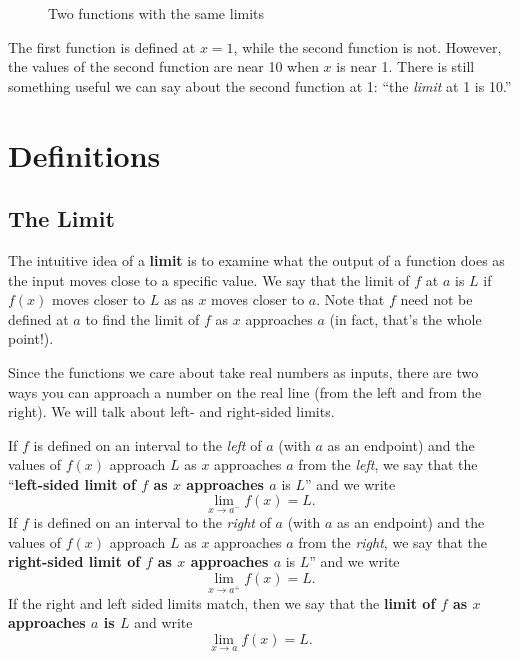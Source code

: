 \begin{exampleblock}
\begin{figure}[H]
{

    }
    \caption{Two functions with the same limits}
\end{figure}

The first function is defined at $x=1$, while the second function is not. However, the values of the second function are near 10 when $x$ is near 1. There is still something useful we can say about the second function at 1: ``the \textit{limit} at 1 is 10.''
\end{exampleblock}



\clearpage
\section{Definitions}

\subsection{The Limit}

The intuitive idea of a \textbf{limit} is to examine what the output of a function does as the input moves close to a specific value. We say that the limit of $f$ at $a$ is $L$ if $f(x)$ moves closer to $L$ as as $x$ moves closer to $a$. Note that $f$ need not be defined at $a$ to find the limit of $f$ as $x$ approaches $a$ (in fact, that's the whole point!).

Since the functions we care about take real numbers as inputs, there are two ways you can approach a number on the real line (from the left and from the right). We will talk about left- and right-sided limits.

If $f$ is defined on an interval to the \textit{left} of $a$ (with $a$ as an endpoint) and the values of $f(x)$ approach $L$ as $x$ approaches $a$ from the \textit{left}, we say that the ``\textbf{left-sided limit of $f$ as $x$ approaches $a$} is $L$'' and we write $$\lim_{x\to a^-}f(x)=L.$$
If $f$ is defined on an interval to the \textit{right} of $a$ (with $a$ as an endpoint) and the values of $f(x)$ approach $L$ as $x$ approaches $a$ from the \textit{right}, we say that the \textbf{right-sided limit of $f$ as $x$ approaches $a$} is $L$'' and we write
$$\lim_{x\to a^+}f(x)=L.$$
If the right and left sided limits match, then we say that the \textbf{limit of $f$ as $x$ approaches $a$ is $L$} and write $$\lim_{x\to a}f(x)=L.$$

